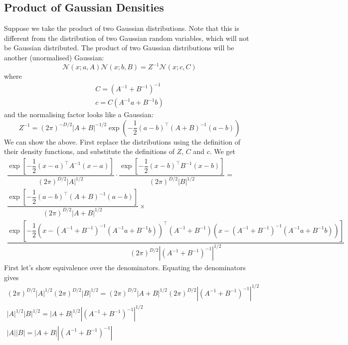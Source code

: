 \documentclass[11pt]{report} %
\begin{document}
\subsection{Product of Gaussian Densities}
Suppose we take the product of two Gaussian distributions. Note that this is different from the distribution of two Gaussian random variables, which will not be Gaussian distributed. The product of two Gaussian distributions will be another (unormalised) Gaussian:
\begin{equation}
\mathcal{N}\left(x; a,A\right)\mathcal{N}\left(x;b,B\right)=Z^{-1}\mathcal{N}\left(x;c,C\right)
\end{equation}
where
\begin{gather}
C=\left(A^{-1}+B^{-1}\right)^{-1} \\
c=C\left(A^{-1}a+B^{-1}b\right)
\end{gather}
and the normalising factor looks like a Gaussian:
\begin{equation}
Z^{-1}=\left(2\pi\right)^{-D/2}\left|A+B\right|^{-1/2}\exp\left(-\dfrac{1}{2}\left(a-b\right)^{\top}\left(A+B\right)^{-1}\left(a-b\right)\right)
\end{equation}
We can show the above. First replace the distributions using the definition of their density functions, and substitute the definitions of $Z$, $C$ and $c$. We get
\begin{multline}
\dfrac{\exp\left[-\dfrac{1}{2}\left(x-a\right)^{\top}A^{-1}\left(x-a\right)\right]}{\left(2\pi\right)^{D/2}\left|A\right|^{1/2}}\cdot\dfrac{\exp\left[-\dfrac{1}{2}\left(x-b\right)^{\top}B^{-1}\left(x-b\right)\right]}{\left(2\pi\right)^{D/2}\left|B\right|^{1/2}} = \\
\dfrac{\exp\left[-\dfrac{1}{2}\left(a-b\right)^{\top}\left(A+B\right)^{-1}\left(a-b\right)\right]}{\left(2\pi\right)^{D/2}\left|A+B\right|^{1/2}}\times \\
\dfrac{\exp\left[-\dfrac{1}{2}\left(x-\left(A^{-1}+B^{-1}\right)^{-1}\left(A^{-1}a+B^{-1}b\right)\right)^{\top}\left(A^{-1}+B^{-1}\right)\left(x-\left(A^{-1}+B^{-1}\right)^{-1}\left(A^{-1}a+B^{-1}b\right)\right)\right]}{\left(2\pi\right)^{D/2}\left|\left(A^{-1}+B^{-1}\right)^{-1}\right|^{1/2}}
\end{multline}
First let's show equivalence over the denominators. Equating the denominators gives
\begin{gather}
\left(2\pi\right)^{D/2}\left|A\right|^{1/2}\left(2\pi\right)^{D/2}\left|B\right|^{1/2}=\left(2\pi\right)^{D/2}\left|A+B\right|^{1/2}\left(2\pi\right)^{D/2}\left|\left(A^{-1}+B^{-1}\right)^{-1}\right|^{1/2} \\
\left|A\right|^{1/2}\left|B\right|^{1/2}=\left|A+B\right|^{1/2}\left|\left(A^{-1}+B^{-1}\right)^{-1}\right|^{1/2} \\
\left|A\right|\left|B\right|=\left|A+B\right|\left|\left(A^{-1}+B^{-1}\right)^{-1}\right|
\end{gather}
\end{document}
